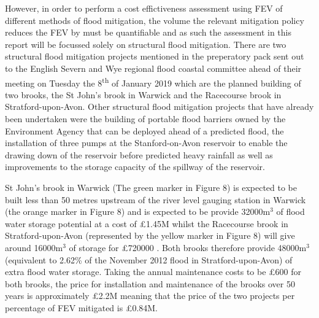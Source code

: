 \documentclass[11pt,a4paper]{article}
\begin{document}
However, in order to perform a cost effictiveness assessment using FEV of different methods of flood mitigation, the volume the relevant mitigation policy reduces the FEV by must be quantifiable and as such the assessment in this report will be focussed solely on structural flood mitigation. There are two structural flood mitigation projects mentioned in the preperatory pack sent out to the English Severn and Wye regional flood coastal committee ahead of their meeting on Tuesday the 8\textsuperscript{th} of January 2019 \cite{brook} which are the planned building of two brooks, the St John's brook in Warwick and the Racecourse brook in Stratford-upon-Avon. Other structural flood mitigation projects that have already been undertaken were the building of portable flood barriers owned by the Environment Agency that can be deployed ahead of a predicted flood, the installation of three pumps at the Stanford-on-Avon reservoir to enable the drawing down of the reservoir before predicted heavy rainfall  as well as improvements to the storage capacity of the spillway of the reservoir.

St John's brook in Warwick (The green marker in Figure 8) is expected to be built less than 50 metres upstream of the river level gauging station in Warwick (the orange marker in Figure 8) and is expected to be provide 32000m$^3$ of flood water storage potential at a cost of \pounds1.45M whilst the Racecourse brook in Stratford-upon-Avon (represented by the yellow marker in Figure 8) will give around 16000m$^3$ of storage for \pounds720000 \cite{brook}. Both brooks therefore provide 48000m$^3$ (equivalent to 2.62\% of the November 2012 flood in Stratford-upon-Avon) of extra flood water storage. Taking the annual maintenance costs to be \pounds600 \cite{cost4} for both brooks, the price for installation and maintenance of the brooks over 50 years is approximately \pounds2.2M meaning that the price of the two projects per percentage of FEV mitigated is \pounds0.84M.
\end{document}
